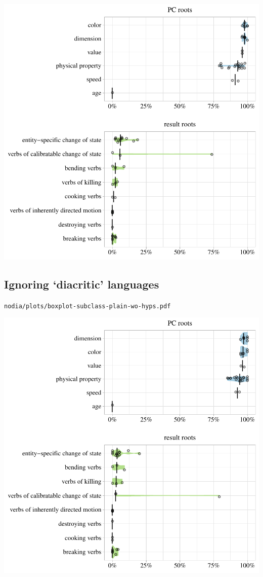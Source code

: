 \includegraphics[width=1.0\textwidth]{../nolow/plots/boxplot-subclass-plain-wo-hyps.pdf}

\subsection{Ignoring `diacritic' languages}

\texttt{nodia/plots/boxplot-subclass-plain-wo-hyps.pdf}

\includegraphics[width=1.0\textwidth]{../nodia/plots/boxplot-subclass-plain-wo-hyps.pdf}

\eject

